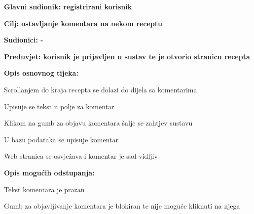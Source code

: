 					\noindent {}
					\begin{packed_item}
						\item \textbf{Glavni sudionik: registrirani korisnik}
						\item  \textbf{Cilj: ostavljanje komentara na nekom receptu}
						\item  \textbf{Sudionici: -}
						\item  \textbf{Preduvjet: korisnik je prijavljen u sustav te je otvorio stranicu recepta}
						
						\item  \textbf{Opis osnovnog tijeka:}
						\item[] \begin{packed_enum}
							\item Scrollanjem do kraja recepta se dolazi do dijela sa komentarima
							\item Upisuje se tekst u polje za komentar
							\item Klikom na gumb za objavu komentara šalje se zahtjev sustavu
							\item U bazu podataka se upisuje komentar
							\item Web stranica se osvježava i komentar je sad vidljiv
						\end{packed_enum}
						
						\item  \textbf{Opis mogućih odstupanja:}
						\item[] \begin{packed_item}
							\item[3.a] Tekst komentara je prazan
							\begin{packed_enum}
								\item Gumb za objavljivanje komentara je blokiran te nije moguće kliknuti na njega
							\end{packed_enum}
						\end{packed_item}
					\end{packed_item}
				

